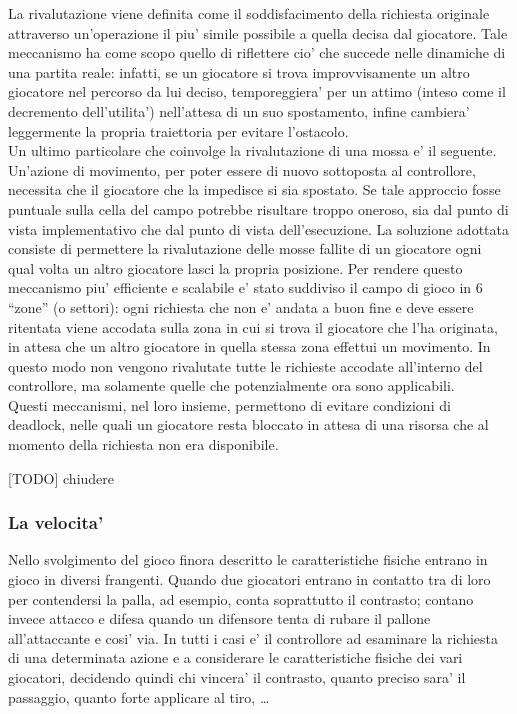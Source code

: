 La rivalutazione viene definita come il soddisfacimento della richiesta originale attraverso un'operazione il piu' simile possibile a quella decisa dal giocatore. Tale meccanismo ha come scopo quello di riflettere cio' che succede nelle dinamiche di una partita reale: infatti, se un giocatore si trova improvvisamente un altro giocatore nel percorso da lui deciso, temporeggiera' per un attimo (inteso come il decremento dell'utilita') nell'attesa di un suo spostamento, infine cambiera' leggermente la propria traiettoria per evitare l'ostacolo.\\

Un ultimo particolare che coinvolge la rivalutazione di una mossa e' il seguente. Un'azione di movimento, per poter essere di nuovo sottoposta al controllore, necessita che il giocatore che la impedisce si sia spostato. Se tale approccio fosse puntuale sulla cella del campo potrebbe risultare troppo oneroso, sia dal punto di vista implementativo che dal punto di vista dell'esecuzione. La soluzione adottata consiste di permettere la rivalutazione delle mosse fallite di un giocatore ogni qual volta un altro giocatore lasci la propria posizione. Per rendere questo meccanismo piu' efficiente e scalabile e' stato suddiviso il campo di gioco in 6 ``zone'' (o settori): ogni richiesta che non e' andata a buon fine e deve essere ritentata viene accodata sulla zona in cui si trova il giocatore che l'ha originata, in attesa che un altro giocatore in quella stessa zona effettui un movimento. In questo modo non vengono rivalutate tutte le richieste accodate all'interno del controllore, ma solamente quelle che potenzialmente ora sono applicabili.\\

Questi meccanismi, nel loro insieme, permettono di evitare condizioni di deadlock, nelle quali un giocatore resta bloccato in attesa di una risorsa che al momento della richiesta non era disponibile.

[TODO] chiudere 

\subsubsection{La velocita'}
\label{sec:analisi_concorrenza_velocita}

Nello svolgimento del gioco finora descritto le caratteristiche fisiche entrano in gioco in diversi frangenti. Quando due giocatori entrano in contatto tra di loro per contendersi la palla, ad esempio, conta soprattutto il contrasto; contano invece attacco e difesa quando un difensore tenta di rubare il pallone all'attaccante e cosi' via. In tutti i casi e' il controllore ad esaminare la richiesta di una determinata azione e a considerare le caratteristiche fisiche dei vari giocatori, decidendo quindi chi vincera' il contrasto, quanto preciso sara' il passaggio, quanto forte applicare al tiro, \ldots\\

